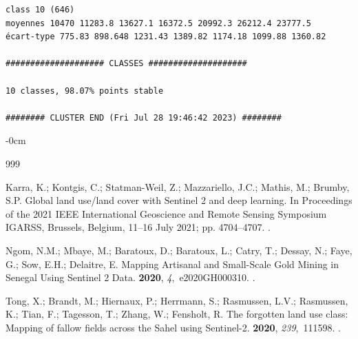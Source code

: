 \documentclass[earth,article,accept,pdftex,moreauthors]{Definitions/mdpi}
\begin{document}
{\begin{scriptsize}
\begin{verbatim}
class 10 (646)
moyennes 10470 11283.8 13627.1 16372.5 20992.3 26212.4 23777.5
écart-type 775.83 898.648 1231.43 1389.82 1174.18 1099.88 1360.82

#################### CLASSES ####################

10 classes, 98.07% points stable

######## CLUSTER END (Fri Jul 28 19:46:42 2023) ########

\end{verbatim}
\end{scriptsize}

\begin{adjustwidth}{-\extralength}{0cm}


\begin{thebibliography}{999}

Karra, K.; Kontgis, C.; Statman-Weil, Z.; Mazzariello, J.C.; Mathis, M.;
  Brumby, S.P.
\newblock Global land use/land cover with Sentinel 2 and deep learning.
\newblock In Proceedings of the 2021 IEEE International Geoscience and Remote
  Sensing Symposium IGARSS, Brussels, Belgium, 11--16 July 2021; %
 pp. 4704--4707.
.

Ngom, N.M.; Mbaye, M.; Baratoux, D.; Baratoux, L.; Catry, T.; Dessay, N.; Faye,
  G.; Sow, E.H.; Delaitre, E.
\newblock Mapping Artisanal and Small-Scale Gold Mining in Senegal Using
  Sentinel 2 Data.
 {\bf 2020}, {\em 4},~e2020GH000310.
.

Tong, X.; Brandt, M.; Hiernaux, P.; Herrmann, S.; Rasmussen, L.V.; Rasmussen,
  K.; Tian, F.; Tagesson, T.; Zhang, W.; Fensholt, R.
\newblock The forgotten land use class: Mapping of fallow fields across the
  Sahel using Sentinel-2.
 {\bf 2020}, {\em 239},~111598.
.


\end{thebibliography}
\end{adjustwidth}}
\end{document}
